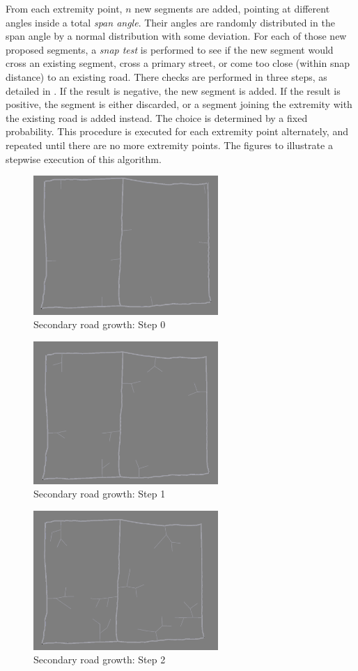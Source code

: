 \documentclass[a4paper,12pt]{scrartcl}
\begin{document}
From each extremity point, $n$ new segments are added, pointing at different angles inside a total \emph{span angle}. Their angles are randomly distributed in the span angle by a normal distribution with some deviation. For each of those new proposed segments, a \emph{snap test} is performed to see if the new segment would cross an existing segment, cross a primary street, or come too close (within snap distance) to an existing road. There checks are performed in three steps, as detailed in \cite{Kell2007}. If the result is negative, the new segment is added. If the result is positive, the segment is either discarded, or a segment joining the extremity with the existing road is added instead. The choice is determined by a fixed probability. This procedure is executed for each extremity point alternately, and repeated until there are no more extremity points. The figures  to  illustrate a stepwise execution of this algorithm.

\begin{figure}[h]
\center
\includegraphics[width=7cm]{s0.png}
\caption{Secondary road growth: Step 0}
\label{fig:sec0}
\end{figure}

\begin{figure}[h]
\center
\includegraphics[width=7cm]{s1.png}
\caption{Secondary road growth: Step 1}
\label{fig:sec1}
\end{figure}

\begin{figure}[h]
\center
\includegraphics[width=7cm]{s2.png}
\caption{Secondary road growth: Step 2}
\label{fig:sec2}
\end{figure}
\end{document}
